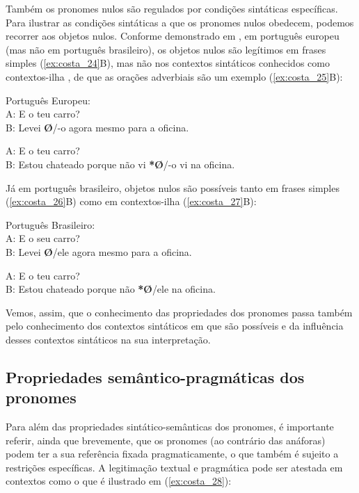 \documentclass[output=paper]{LSP/langsci}
\begin{document}
Também os pronomes nulos são regulados por condições sintáticas específicas. Para ilustrar as condições sintáticas a que os pronomes nulos obedecem, podemos recorrer aos objetos nulos. Conforme demonstrado em \citet{raposo1986}, em português europeu (mas não em português brasileiro), os objetos nulos são legítimos em frases simples (\ref{ex:costa_24}B), mas não nos contextos sintáticos conhecidos como contextos-ilha \citep{ross1969}, de que as orações adverbiais são um exemplo (\ref{ex:costa_25}B):

\ea\label{ex:costa_24}
Português Europeu:\\
A: E o teu carro?\\
B: Levei \textbf{Ø}/-o agora mesmo para a oficina.
\z

\ea\label{ex:costa_25}
A: E o teu carro?\\
B: Estou chateado porque não vi \textbf{*Ø}/-o vi na oficina.
\z

Já em português brasileiro, objetos nulos são possíveis tanto em frases simples (\ref{ex:costa_26}B) como em contextos-ilha (\ref{ex:costa_27}B):

\ea\label{ex:costa_26}
Português Brasileiro:\\
A: E o seu carro?\\
B: Levei \textbf{Ø}/ele agora mesmo para a oficina.
\z

\ea\label{ex:costa_27}
A: E o teu carro?\\
B: Estou chateado porque não \textbf{*Ø}/ele na oficina.
\z

Vemos, assim, que o conhecimento das propriedades dos pronomes passa também pelo conhecimento dos contextos sintáticos em que são possíveis e da influência desses contextos sintáticos na sua interpretação.

\subsection{Propriedades se\-mân\-ti\-co-prag\-má\-ti\-cas dos pronomes}
\label{subsec:costa_propriedades_sem_prag_pronomes}

Para além das propriedades sintático-semânticas dos pronomes, é importante referir, ainda que brevemente, que os pronomes (ao contrário das anáforas) podem ter a sua referência fixada pragmaticamente, o que também é sujeito a restrições específicas. A legitimação textual e pragmática pode ser atestada em contextos como o que é ilustrado em (\ref{ex:costa_28}):
\end{document}
